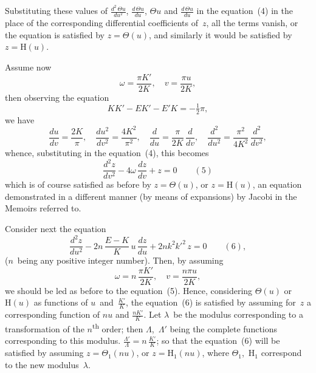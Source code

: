 \documentclass[11pt,a4paper]{book}
\begin{document}
\newpage
Substituting these values of $\frac{d^2\,\Theta u}{du^2}$, $\frac{d\,\Theta u}{du}$, $\Theta u$ and $\frac{d\,\Theta u}{du}$ in the equation~(4) in the place of the corresponding differential coefficients of~$z$, all the terms vanish, or the equation is satisfied by $z = \Theta(u)$, and similarly it would be satisfied by $z = \mathrm{H}(u)$.

Assume now
\[
\omega = \frac{\pi K'}{2K}, \quad v = \frac{\pi u}{2K},
\]
then observing the equation
\[
KK' - EK' - E'K = -\tfrac{1}{2}\pi,
\]
we have
\[
\frac{du}{dv} = \frac{2K}{\pi}, \quad \frac{du^2}{dv^2} = \frac{4K^2}{\pi^2}, \quad \frac{d}{du} = \frac{\pi}{2K}\,\frac{d}{dv}, \quad \frac{d^2}{du^2} = \frac{\pi^2}{4K^2}\,\frac{d^2}{dv^2},
\]
whence, substituting in the equation~(4), this becomes
\[
\frac{d^2z}{dv^2} - 4\omega\,\frac{dz}{dv} + z = 0 \qquad(5)
\]
which is of course satisfied as before by $z = \Theta(u)$, or $z = \mathrm{H}(u)$, an equation demonstrated in a different manner (by means of expansions) by Jacobi in the Memoirs referred to.

Consider next the equation
\[
\frac{d^2z}{du^2} - 2n\,\frac{E-K}{K}\,u\,\frac{dz}{du} + 2nk^2k'^2\,z = 0 \qquad(6),
\]
($n$~being any positive integer number). Then, by assuming
\[
\omega = n\,\frac{\pi K'}{2K}, \quad v = \frac{n\pi u}{2K},
\]
we should be led as before to the equation~(5). Hence, considering $\Theta(u)$ or $\mathrm{H}(u)$ as functions of $u$~and~$\frac{K'}{K}$, the equation~(6) is satisfied by assuming for~$z$ a corresponding function of $nu$ and $\frac{nK'}{K}$. Let $\lambda$~be the modulus corresponding to a transformation of the $n$\textsuperscript{th} order; then $\Lambda$,~$\Lambda'$ being the complete functions corresponding to this modulus. $\frac{\Lambda'}{\Lambda} = n\,\frac{K'}{K}$; so that the equation~(6) will be satisfied by assuming $z = \Theta_1(nu)$, or $z = \mathrm{H}_1(nu)$, where $\Theta_1$,~$\mathrm{H}_1$ correspond to the new modulus~$\lambda$.
\end{document}

